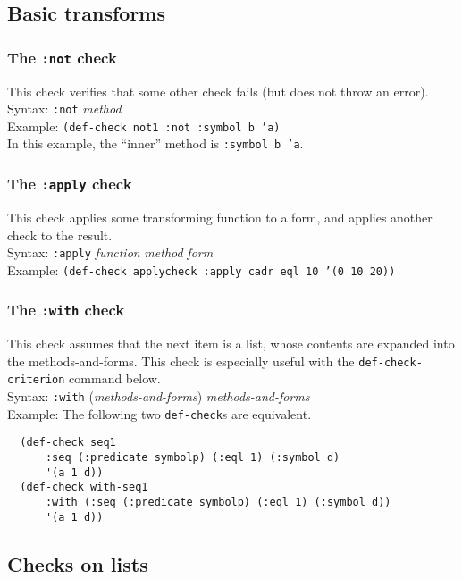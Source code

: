 \documentclass{article}
\begin{document}
\subsection{Basic transforms}

\subsubsection{The \texttt{:not} check} 
This check verifies that some other check fails (but does not throw an
error).
\\ Syntax: \texttt{:not} \textit{method}
\\ Example: \texttt{(def-check not1 :not :symbol b 'a)}
\\In this example, the ``inner'' method is \texttt{:symbol b 'a}\enspace.

\subsubsection{The \texttt{:apply} check} 
This check applies some transforming function to a form, and applies
another check to the result.
\\ Syntax: \texttt{:apply} \textit{function} \textit{method} \textit{form}
\\ Example: \texttt{(def-check applycheck :apply cadr eql 10 '(0 10 20))}

\subsubsection{The \texttt{:with} check} 
This check assumes that the next item is a list, whose contents are
expanded into the methods-and-forms. This
check is especially useful with the \texttt{def-check-cri\-ter\-ion}
command below.
\\ Syntax: \texttt{:with} (\textit{methods-and-forms}) \textit{methods-and-forms}
\\ Example: The following two \texttt{def-check}s are equivalent.
\begin{verbatim}
  (def-check seq1
      :seq (:predicate symbolp) (:eql 1) (:symbol d)
      '(a 1 d))
  (def-check with-seq1
      :with (:seq (:predicate symbolp) (:eql 1) (:symbol d))
      '(a 1 d))
\end{verbatim}

\subsection{Checks on lists}
\end{document}
